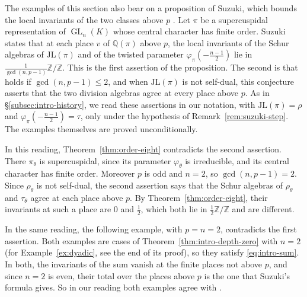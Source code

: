\documentclass[a4paper,11pt]{amsart}
\theoremstyle{definition}
\theoremstyle{remark}
\numberwithin{equation}{section}
\newcommand{\Q}{\mathbb{Q}}
\newcommand{\Z}{\mathbb{Z}}
\DeclareMathOperator{\GL}{GL}
\newcommand{\JL}{\mathrm{JL}}
\begin{document}
The examples of this section also bear on a proposition of Suzuki, which bounds the local invariants of the two classes above $p$ \cite[Proposition~4.0.13]{Su23}. Let $\pi$ be a supercuspidal representation of $\GL_n(K)$ whose central character has finite order. Suzuki states that at each place $v$ of $\Q(\pi)$ above $p$, the local invariants of the Schur algebras of $\JL(\pi)$ and of the twisted parameter $\varphi_\pi(-\frac{n-1}2)$ lie in $\frac{1}{\gcd(n,p-1)}\Z/\Z$. This is the first assertion of the proposition. The second is that \cite[Conjecture~4.0.7]{Su23} holds if $\gcd(n,p-1)\le2$, and when $\JL(\pi)$ is not self-dual, this conjecture asserts that the two division algebras agree at every place above $p$. As in \S\ref{subsec:intro-history}, we read these assertions in our notation, with $\JL(\pi)=\rho$ and $\varphi_\pi(-\frac{n-1}2)=\tau$, only under the hypothesis of Remark~\ref{rem:suzuki-step}. The examples themselves are proved unconditionally.

In this reading, Theorem~\ref{thm:order-eight} contradicts the second assertion. There $\pi_\theta$ is supercuspidal, since its parameter $\varphi_\theta$ is irreducible, and its central character has finite order. Moreover $p$ is odd and $n=2$, so $\gcd(n,p-1)=2$. Since $\rho_\theta$ is not self-dual, the second assertion says that the Schur algebras of $\rho_\theta$ and $\tau_\theta$ agree at each place above $p$. By Theorem~\ref{thm:order-eight}, their invariants at such a place are $0$ and $\frac12$, which both lie in $\frac12\Z/\Z$ and are different.

In the same reading, the following example, with $p=n=2$, contradicts the first assertion. Both examples are cases of Theorem~\ref{thm:intro-depth-zero} with $n=2$ (for Example~\ref{ex:dyadic}, see the end of its proof), so they satisfy \eqref{eq:intro-sum}. In both, the invariants of the sum vanish at the finite places not above $p$, and since $n=2$ is even, their total over the places above $p$ is the one that Suzuki's formula gives. So in our reading both examples agree with \cite[Theorem~4.0.5 and~(4.0.6)]{Su23}.
\end{document}
